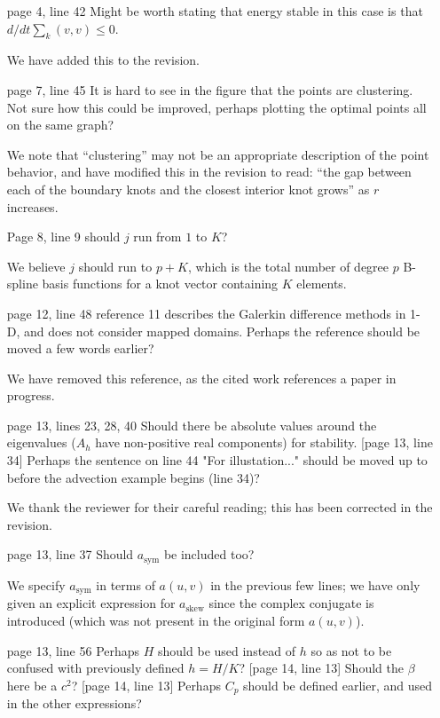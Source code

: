 \documentclass[10pt]{article}
\newcommand{\note}[1]{{\color{violet}#1}}
\begin{document}
\begin{enumerate}
\begin{enumerate}
\item [page 4, line 42] Might be worth stating that energy stable in this case is that $d/dt\sum_{k}(v, v) \le 0$.

\note{We have added this to the revision.}

\item [page 7, line 45] It is hard to see in the figure that the points are clustering. Not sure how this could be improved, perhaps plotting the optimal points all on the same graph?

\note{We note that ``clustering'' may not be an appropriate description of the point behavior, and have modified this in the revision to read: ``the gap between each of the boundary knots and the closest interior knot grows'' as $r$ increases.}

\item [Page 8, line 9] should $j$ run from $1$ to $K$?

\note{We believe $j$ should run to $p+K$, which is the total number of degree $p$ B-spline basis functions for a knot vector containing $K$ elements.}

\item [page 12, line 48] reference 11 describes the Galerkin difference methods in 1-D, and does not consider mapped domains. Perhaps the reference should be moved a few words earlier?  

\note{We have removed this reference, as the cited work references a paper in progress.}

\item [page 13, lines 23, 28, 40] Should there be absolute values around the eigenvalues ($A_{h}$ have non-positive real components) for stability.  [page 13, line 34] Perhaps the sentence on line 44 "For illustation..." should be moved up to before the advection example begins (line 34)?

\note{We thank the reviewer for their careful reading; this has been corrected in the revision.}

\item [page 13, line 37] Should $a_{\mbox{sym}}$ be included too?

\note{We specify $a_{\mbox{sym}}$ in terms of $a(u,v)$ in the previous few lines; we have only given an explicit expression for $a_{\mbox{skew}}$ since the complex conjugate is introduced (which was not present in the original form $a(u,v)$).}

\item [page 13, line 56] Perhaps $H$ should be used instead of $h$ so as not to be confused with previously defined $h = H / K$?  [page 14, line 13] Should the $\beta$ here be a $c^2$?  [page 14, line 13] Perhaps $C_{p}$ should be defined earlier, and used in the other expressions?


\end{enumerate}
\end{enumerate}
\end{document}
